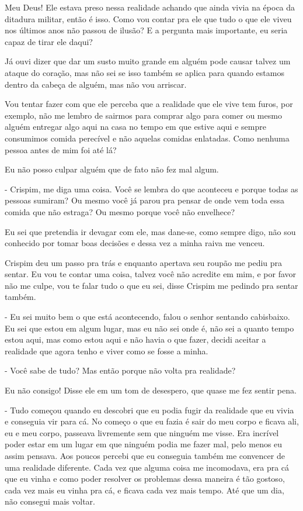Meu Deus! Ele estava preso nessa realidade achando que ainda vivia na época da ditadura militar, então é isso. Como vou contar pra ele que tudo o que ele viveu nos últimos anos não passou de ilusão? E a pergunta mais importante, eu seria capaz de tirar ele daqui?

Já ouvi dizer que dar um susto muito grande em alguém pode causar talvez um ataque do coração, mas não sei se isso também se aplica para quando estamos dentro da cabeça de alguém, mas não vou arriscar.

Vou tentar fazer com que ele perceba que a realidade que ele vive tem furos, por exemplo, não me lembro de sairmos para comprar algo para comer ou mesmo alguém entregar algo aqui na casa no tempo em que estive aqui e sempre consumimos comida perecível e não aquelas comidas enlatadas. Como nenhuma pessoa antes de mim foi até lá?

Eu não posso culpar alguém que de fato não fez mal algum.

- Crispim, me diga uma coisa. Você se lembra do que aconteceu e porque todas as pessoas sumiram? Ou mesmo você já parou pra pensar de onde vem toda essa comida que não estraga? Ou mesmo porque você não envelhece?

Eu sei que pretendia ir devagar com ele, mas dane-se, como sempre digo, não sou conhecido por tomar boas decisões e dessa vez a minha raiva me venceu.

Crispim deu um passo pra trás e enquanto apertava seu roupão me pediu pra sentar. Eu vou te contar uma coisa, talvez você não acredite em mim, e por favor não me culpe, vou te falar tudo o que eu sei, disse Crispim me pedindo pra sentar também.

- Eu sei muito bem o que está acontecendo, falou o senhor sentando cabisbaixo. Eu sei que estou em algum lugar, mas eu não sei onde é, não sei a quanto tempo estou aqui, mas como estou aqui e não havia o que fazer, decidi aceitar a realidade que agora tenho e viver como se fosse a minha.

- Você sabe de tudo? Mas então porque não volta pra realidade?

Eu não consigo! Disse ele em um tom de desespero, que quase me fez sentir pena.

- Tudo começou quando eu descobri que eu podia fugir da realidade que eu vivia e conseguia vir para cá. No começo o que eu fazia é sair do meu corpo e ficava ali, eu e meu corpo, passeava livremente sem que ninguém me visse. Era incrível poder estar em um lugar em que ninguém podia me fazer mal, pelo menos eu assim pensava. Aos poucos percebi que eu conseguia também me convencer de uma realidade diferente. Cada vez que alguma coisa me incomodava, era pra cá que eu vinha e como poder resolver os problemas dessa maneira é tão gostoso, cada vez mais eu vinha pra cá, e ficava cada vez mais tempo. Até que um dia, não consegui mais voltar.

